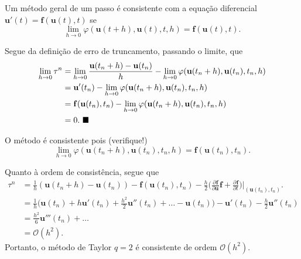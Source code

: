 \documentclass[../differential_methods.tex]{subfiles}
\begin{document}
\begin{theorem*}
	Um método geral de um passo é consistente com a equação diferencial \(\mathbf{u}'(t)=\mathbf{f}(\mathbf{u}(t), t)\) se
	\[
		\lim_{h\to 0}\varphi (\mathbf{u}(t+h), \mathbf{u}(t), t, h)=\mathbf{f}(\mathbf{u}(t), t).
	\]
\end{theorem*}
\begin{proof*}
	Segue da definição de erro de truncamento, passando o limite, que
	\begin{align*}
		\lim_{h\to 0}\tau^{n} & = \lim_{h\to 0}\frac{\mathbf{u}(t_{n}+h)-\mathbf{u}(t_{n})}{h}-\lim_{h\to 0}\varphi (\mathbf{u}(t_{n}+h), \mathbf{u}(t_{n}), t_{n}, h) \\
		                      & = \mathbf{u}'(t_{n})-\lim_{h\to 0}\varphi (\mathbf{u}(t_{n}+h), \mathbf{u}(t_{n}), t_{n}, h)                                           \\
		                      & = \mathbf{f}(\mathbf{u}(t_{n}), t_{n})-\lim_{h\to 0}\varphi (\mathbf{u}(t_{n}+h), \mathbf{u}(t_{n}), t_{n}, h)                         \\
		                      & =0. \text{ $\blacksquare$}
	\end{align*}
\end{proof*}

\begin{example}[Consistência do Método de Taylor de \(q=2\)]
	O método é consistente pois (verifique!)
	\[
		\lim_{h\to 0}\varphi (\mathbf{u}(t_{n}+h), \mathbf{u}(t_{n}), t_{n}, h)=\mathbf{f}(\mathbf{u}(t_{n}), t_{n}).
	\]

	Quanto à ordem de consistência, segue que
	\begin{align*}
		\tau^{n} & =\frac{1}{h}(\mathbf{u}(t_{n}+h)-\mathbf{u}(t_{n}))-\mathbf{f}(\mathbf{u}(t_{n}), t_{n})-\frac{h}{2}\biggl(\frac{\partial^{}\mathbf{f}}{\partial \mathbf{u}^{}}\mathbf{f}+\frac{\partial^{}\mathbf{f}}{\partial t^{}}\biggr)\biggl|_{(\mathbf{u}(t_{n}), t_{n})}^{}\biggr. \\
		         & =\frac{1}{h}\biggl(\mathbf{u}(t_{n})+h \mathbf{u}'(t_{n}) + \frac{h^{2}}{2}\mathbf{u}''(t_{n})+\dotsc - \mathbf{u}(t_{n})\biggr)-\mathbf{u}'(t_{n}) - \frac{h}{2} \mathbf{u}''(t_{n})                                                                                      \\
		         & = \frac{h^{2}}{6}\mathbf{u}'''(t_{n})+\dotsc                                                                                                                                                                                                                               \\
		         & = \mathcal{O}(h^{2}).
	\end{align*}
	Portanto, o método de Taylor \(q=2\) é consistente de ordem \(\mathcal{O}(h^{2})\).
\end{example}
\end{document}
